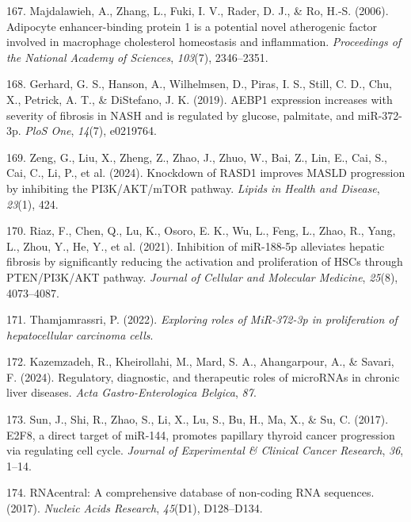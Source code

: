 \documentclass[
  11pt,
  letterpaper,
]{book}
\newlength{\cslhangindent}
\newenvironment{CSLReferences}[2] %
 {\begin{list}{}{%
  \setlength{\itemindent}{0pt}
  \setlength{\leftmargin}{0pt}
  \setlength{\parsep}{0pt}
  \ifodd #1
   \setlength{\leftmargin}{\cslhangindent}
   \setlength{\itemindent}{-1\cslhangindent}
  \fi
  \setlength{\itemsep}{#2\baselineskip}}}
 {\end{list}}
\begin{document}
\begin{CSLReferences}{1}{0}
167. Majdalawieh, A., Zhang, L., Fuki, I. V., Rader, D. J., \& Ro, H.-S.
(2006). Adipocyte enhancer-binding protein 1 is a potential novel
atherogenic factor involved in macrophage cholesterol homeostasis and
inflammation. \emph{Proceedings of the National Academy of Sciences},
\emph{103}(7), 2346--2351.

168. Gerhard, G. S., Hanson, A., Wilhelmsen, D., Piras, I. S., Still, C.
D., Chu, X., Petrick, A. T., \& DiStefano, J. K. (2019). AEBP1
expression increases with severity of fibrosis in NASH and is regulated
by glucose, palmitate, and miR-372-3p. \emph{PloS One}, \emph{14}(7),
e0219764.

169. Zeng, G., Liu, X., Zheng, Z., Zhao, J., Zhuo, W., Bai, Z., Lin, E.,
Cai, S., Cai, C., Li, P., et al. (2024). Knockdown of RASD1 improves
MASLD progression by inhibiting the PI3K/AKT/mTOR pathway. \emph{Lipids
in Health and Disease}, \emph{23}(1), 424.

170. Riaz, F., Chen, Q., Lu, K., Osoro, E. K., Wu, L., Feng, L., Zhao,
R., Yang, L., Zhou, Y., He, Y., et al. (2021). Inhibition of miR-188-5p
alleviates hepatic fibrosis by significantly reducing the activation and
proliferation of HSCs through PTEN/PI3K/AKT pathway. \emph{Journal of
Cellular and Molecular Medicine}, \emph{25}(8), 4073--4087.

171. Thamjamrassri, P. (2022). \emph{Exploring roles of MiR-372-3p in
proliferation of hepatocellular carcinoma cells}.

172. Kazemzadeh, R., Kheirollahi, M., Mard, S. A., Ahangarpour, A., \&
Savari, F. (2024). Regulatory, diagnostic, and therapeutic roles of
microRNAs in chronic liver diseases. \emph{Acta Gastro-Enterologica
Belgica}, \emph{87}.

173. Sun, J., Shi, R., Zhao, S., Li, X., Lu, S., Bu, H., Ma, X., \& Su,
C. (2017). E2F8, a direct target of miR-144, promotes papillary thyroid
cancer progression via regulating cell cycle. \emph{Journal of
Experimental \& Clinical Cancer Research}, \emph{36}, 1--14.

174. RNAcentral: A comprehensive database of non-coding RNA sequences.
(2017). \emph{Nucleic Acids Research}, \emph{45}(D1), D128--D134.


\end{CSLReferences}
\end{document}
